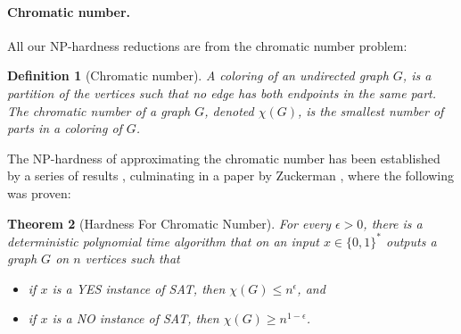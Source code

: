 \documentclass[10pt,a4paper]{article}
\newtheorem{theorem}{Theorem}
\newtheorem{definition}[theorem]{Definition}
\begin{document}
\paragraph{Chromatic number.} All our NP-hardness reductions are from the chromatic number problem:
\begin{definition}[Chromatic number] A coloring of an undirected graph $G$, is a partition of the vertices such that no edge has both endpoints in the same part. The chromatic number of a graph $G$, denoted $\chi(G)$, is the smallest number of parts in a coloring of $G$.\end{definition}
The NP-hardness of approximating the chromatic number has been established by a series of results \cite{ref42,ref24,ref20}, culminating in a paper by Zuckerman \cite{ref65}, where the following was proven:
\begin{theorem}[Hardness For Chromatic Number]\label{thm:chromatic}
For every $\epsilon>0$, there is a deterministic polynomial time algorithm that on an input $x\in\{0,1\}^*$ outputs a graph $G$ on $n$ vertices such that
\begin{itemize}
\item if $x$ is a YES instance of SAT, then $\chi(G)\le n^\epsilon$, and
\item if $x$ is a NO instance of SAT, then $\chi(G)\ge n^{1-\epsilon}$.
\end{itemize}
\end{theorem}
\end{document}
